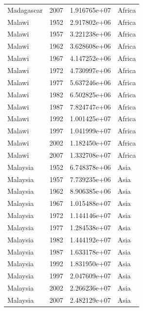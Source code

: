 \documentclass[
  letterpaper,
  DIV=11,
  numbers=noendperiod]{scrreprt}
\begin{document}
\begin{tcolorbox}
\begin{tabular}{lrrl}
Madagascar               &  2007 &  1.916765e+07 &    Africa \\
Malawi                   &  1952 &  2.917802e+06 &    Africa \\
Malawi                   &  1957 &  3.221238e+06 &    Africa \\
Malawi                   &  1962 &  3.628608e+06 &    Africa \\
Malawi                   &  1967 &  4.147252e+06 &    Africa \\
Malawi                   &  1972 &  4.730997e+06 &    Africa \\
Malawi                   &  1977 &  5.637246e+06 &    Africa \\
Malawi                   &  1982 &  6.502825e+06 &    Africa \\
Malawi                   &  1987 &  7.824747e+06 &    Africa \\
Malawi                   &  1992 &  1.001425e+07 &    Africa \\
Malawi                   &  1997 &  1.041999e+07 &    Africa \\
Malawi                   &  2002 &  1.182450e+07 &    Africa \\
Malawi                   &  2007 &  1.332708e+07 &    Africa \\
Malaysia                 &  1952 &  6.748378e+06 &      Asia \\
Malaysia                 &  1957 &  7.739235e+06 &      Asia \\
Malaysia                 &  1962 &  8.906385e+06 &      Asia \\
Malaysia                 &  1967 &  1.015488e+07 &      Asia \\
Malaysia                 &  1972 &  1.144146e+07 &      Asia \\
Malaysia                 &  1977 &  1.284538e+07 &      Asia \\
Malaysia                 &  1982 &  1.444192e+07 &      Asia \\
Malaysia                 &  1987 &  1.633178e+07 &      Asia \\
Malaysia                 &  1992 &  1.831950e+07 &      Asia \\
Malaysia                 &  1997 &  2.047609e+07 &      Asia \\
Malaysia                 &  2002 &  2.266236e+07 &      Asia \\
Malaysia                 &  2007 &  2.482129e+07 &      Asia \\

\end{tabular}
\end{tcolorbox}
\end{document}
